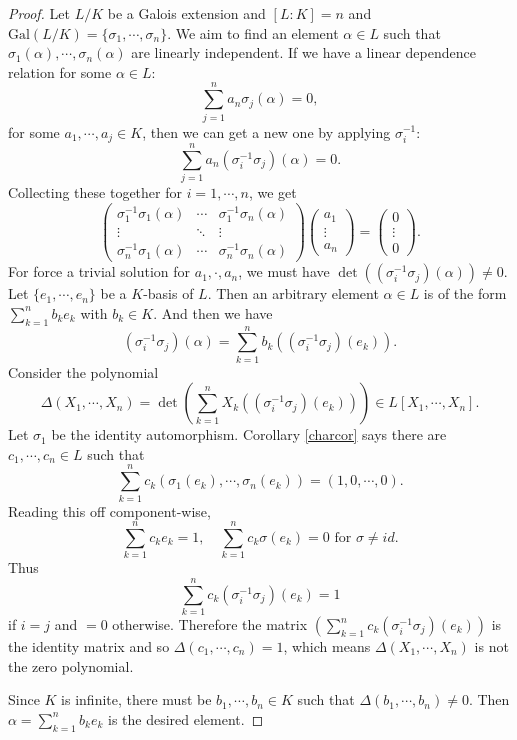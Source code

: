 \documentclass[12pt]{report}
\theoremstyle{definition}
\def\aa{\alpha}
\def\Gal{\text{Gal}}
\begin{document}
\begin{proof}
    Let $L/K$ be a Galois extension and $[L:K]=n$ and $\Gal(L/K)=\{\sigma_1,\cdots,\sigma_n\}$. We aim to find an element $\aa\in L$ such that $\sigma_1(\aa),\cdots,\sigma_n(\aa)$ are linearly independent.
    If we have a linear dependence relation for some $\aa\in L$: $$\sum_{j=1}^n a_n\sigma_j(\aa) = 0,$$ for some $a_1,\cdots,a_j\in K$, then we can get a new one by applying $\sigma_i^{-1}$: $$\sum_{j=1}^n a_n(\sigma_i^{-1}\sigma_j)(\aa) = 0.$$
    Collecting these together for $i=1,\cdots,n$, we get $$\begin{pmatrix}
        \sigma_1^{-1}\sigma_1(\aa) &\cdots& \sigma_1^{-1}\sigma_n(\aa)\\
        \vdots &\ddots&\vdots\\
        \sigma_n^{-1}\sigma_1(\aa) &\cdots & \sigma_n^{-1}\sigma_n(\aa)
    \end{pmatrix} \begin{pmatrix}
        a_1 \\
        \vdots\\
        a_n
    \end{pmatrix} = \begin{pmatrix}
        0\\
        \vdots\\
        0
    \end{pmatrix}.$$
    For force a trivial solution for $a_1,\cdot,a_n$, we must have $\det((\sigma_i^{-1}\sigma_j)(\aa)) \not= 0.$
    Let $\{e_1,\cdots,e_n\}$ be a $K$-basis of $L$. Then an arbitrary element $\aa\in L$ is of the form $\sum_{k=1}^n b_k e_k$ with $b_k\in K$. And then we have $$(\sigma_i^{-1}\sigma_j)(\aa)=\sum_{k=1}^n b_k((\sigma_i^{-1}\sigma_j)(e_k)).$$
    Consider the polynomial $$\Delta(X_1,\cdots, X_n) = \det(\sum_{k=1}^n X_k((\sigma_i^{-1}\sigma_j)(e_k)))\in L[X_1,\cdots,X_n].$$
    Let $\sigma_1$ be the identity automorphism. Corollary \ref{charcor} says there are $c_1,\cdots, c_n\in L$ such that    $$\sum_{k=1}^nc_k(\sigma_1(e_k),\cdots,\sigma_n(e_k))=(1,0,\cdots,0).$$ Reading this off component-wise, $$\sum_{k=1}^n c_ke_k=1, \quad \sum_{k=1}^n c_k \sigma(e_k)=0 \mbox{ for }\sigma\not= id.$$
    Thus $$ \sum_{k=1}^n c_k (\sigma_i^{-1} \sigma_j)(e_k)=1$$ if $i=j$ and $=0$ otherwise. Therefore the matrix $(\sum_{k=1}^n c_k (\sigma_i^{-1} \sigma_j)(e_k))$ is the identity matrix and so $\Delta(c_1,\cdots,c_n)  =1 $, which means $\Delta(X_1,\cdots,X_n)$ is not the zero polynomial.

    Since $K$ is infinite, there must be $b_1,\cdots, b_n\in K$ such that $\Delta(b_1,\cdots,b_n)\not=0$. Then $\aa=\sum_{k=1}^n b_k e_k$ is the desired element.
\end{proof}
\end{document}
